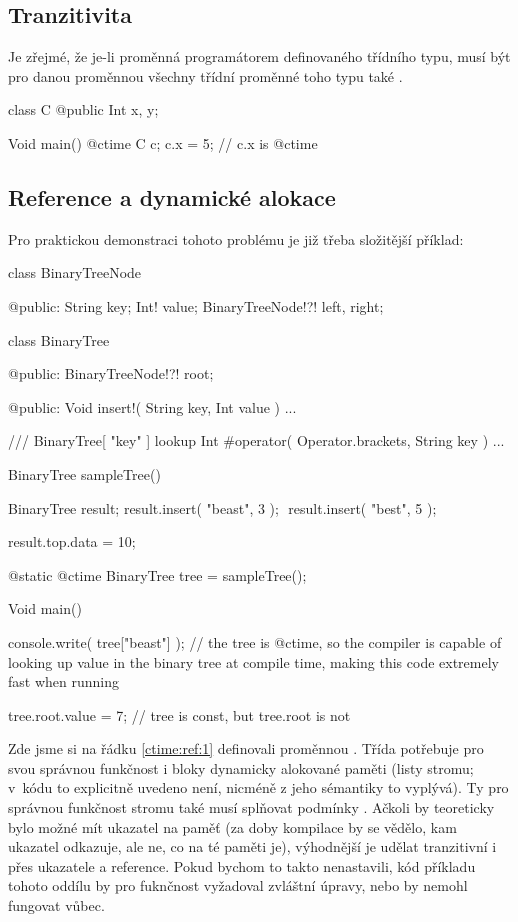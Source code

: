 \subsection{Tranzitivita \ctime}
Je zřejmé, že je-li proměnná \ctime programátorem definovaného třídního typu, musí být pro danou proměnnou všechny třídní proměnné toho typu také \ctime.

\begin{code}
class C {
	@public Int x, y;
}

Void main() {
	@ctime C c;
	c.x = 5; // c.x is @ctime
}
\end{code}

\subsection{Reference a dynamické alokace} \label{ctime:ref}
Pro praktickou demonstraci tohoto problému je již třeba složitější příklad:
\begin{code}
class BinaryTreeNode {
	
@public:
	String key;
	Int! value;
	BinaryTreeNode!?! left, right;
	
}
	
class BinaryTree {

@public:
	BinaryTreeNode!?! root;
	
@public:
	Void insert!( String key, Int value ) { ... }
	
	/// BinaryTree[ "key" ] lookup
	Int #operator( Operator.brackets, String key ) { ... }

}

BinaryTree sampleTree() {
	BinaryTree result;
	result.insert( "beast", 3 ); $\label{ctime:ref:2}$
	result.insert( "best", 5 ); $\label{ctime:ref:3}$
	
	result.top.data = 10;
}

@static @ctime BinaryTree tree = sampleTree(); $\label{ctime:ref:1}$

Void main() {
	console.write( tree["beast"] ); // the tree is @ctime, so the compiler is capable of looking up value in the binary tree at compile time, making this code extremely fast when running
	
	tree.root.value = 7; // tree is const, but tree.root is not $\label{ctime:ref:4}$
}
\end{code}

Zde jsme si na řádku \ref{ctime:ref:1} definovali \ctime proměnnou .  Třída  potřebuje pro svou správnou funkčnost i bloky dynamicky alokované paměti (listy stromu; v~kódu to explicitně uvedeno není, nicméně z jeho sémantiky to vyplývá). Ty pro správnou funkčnost stromu také musí splňovat podmínky \ctime. Ačkoli by teoreticky bylo možné mít \ctime ukazatel na \nonctime paměť (za doby kompilace by se vědělo, kam ukazatel odkazuje, ale ne, co na té paměti je), výhodnější je udělat \ctime tranzitivní i přes ukazatele a reference. Pokud bychom to takto nenastavili, kód příkladu tohoto oddílu by pro fuknčnost vyžadoval zvláštní úpravy, nebo by nemohl fungovat vůbec.

